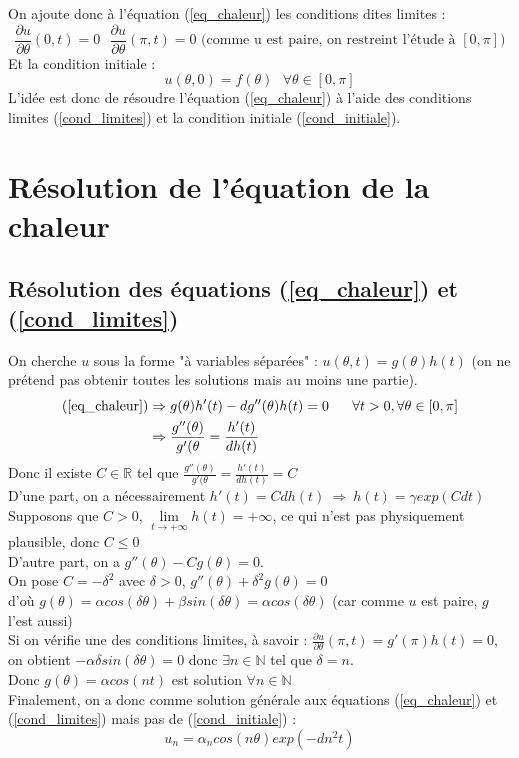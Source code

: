 \documentclass[a4paper,10pt]{report}
\begin{document}
On ajoute donc à l'équation (\ref{eq_chaleur}) les conditions dites limites :
\begin{equation}
\label{cond_limites}
\frac{\partial u}{\partial \theta}(0,t)=0 \ \ \ \frac{\partial u}{\partial \theta}(\pi,t)=0 \text{ (comme u est paire, on restreint l'étude à }[0,\pi])
\end{equation}
Et la condition initiale :
\begin{equation}
\label{cond_initiale}
u(\theta,0)=f(\theta) \ \ \ \forall \theta \in [0,\pi]
\end{equation}
L'idée est donc de résoudre l'équation (\ref{eq_chaleur}) à l'aide des conditions limites (\ref{cond_limites}) et la condition initiale (\ref{cond_initiale}).

\section{Résolution de l'équation de la chaleur}
\subsection{Résolution des équations (\ref{eq_chaleur}) et (\ref{cond_limites})}
On cherche $u$ sous la forme "à variables séparées" : $u(\theta,t)=g(\theta)h(t)$ (on ne prétend pas obtenir toutes les solutions mais au moins une partie).
\begin{align*}
\text{(\ref{eq_chaleur})} & \Rightarrow g(\theta)h'(t)-dg''(\theta)h(t) = 0 \ \ \ \ \ \forall t >0, \forall \theta \in [0,\pi] \\
						  & \Rightarrow \frac{g''(\theta)}{g'(\theta} = \frac{h'(t)}{dh(t)}
\end{align*}
Donc il existe $C \in \mathbb{R}$ tel que $\frac{g''(\theta)}{g'(\theta} = \frac{h'(t)}{dh(t)}=C$ \\
D'une part, on a nécessairement $h'(t)=Cdh(t) \ \Rightarrow \ h(t)=\gamma exp(Cdt)$ \\
Supposons que $C>0$, $\lim \limits_{t\rightarrow +\infty} h(t) = +\infty$, ce qui n'est pas physiquement plausible, donc $C\leq 0$ \\
D'autre part, on a $g''(\theta)-Cg(\theta)=0$.\\
On pose $C=-\delta^2$ avec $\delta>0$, $g''(\theta)+\delta^2g(\theta)=0$\\
d'où $g(\theta)=\alpha cos(\delta \theta) + \beta sin(\delta \theta) = \alpha cos(\delta \theta)$ (car comme $u$ est paire, $g$ l'est aussi) \\
Si on vérifie une des conditions limites, à savoir : $\frac{\partial u}{\partial \theta}(\pi,t)=g'(\pi)h(t)=0$, \\
on obtient $-\alpha \delta sin(\delta \theta)=0$ donc $\exists n \in \mathbb{N}$ tel que $\delta=n$.\\
Donc $g(\theta)=\alpha cos(nt)$ est solution $\forall n \in \mathbb{N}$ \\
Finalement, on a donc comme solution générale aux équations (\ref{eq_chaleur}) et (\ref{cond_limites}) mais pas de (\ref{cond_initiale}) :
\abovedisplayskip=0mm
\begin{displaymath}
u_n = \alpha_n cos(n \theta) exp(-dn^2t)
\end{displaymath}
\end{document}
